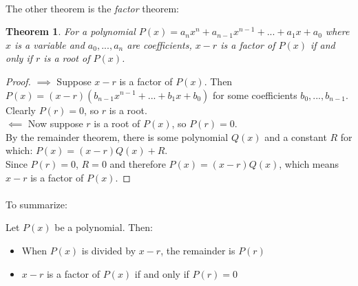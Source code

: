 \documentclass[12pt, a4paper, titlepage, twoside]{article}
\newtheorem*{theorem*}{Theorem}
\begin{document}
	\paragraph{}
	The other theorem is the \textit{factor} theorem:\\
	
	\begin{pf}
		\begin{theorem*}
			For a polynomial $P(x) = a_n x^n + a_{n-1} x^{n-1} + ... + a_1 x + a_0$ where $x$ is a variable and $a_0, ..., a_n$ are
			coefficients, $x-r$ is a factor of $P(x)$ if and only if $r$ is a root of $P(x)$.
		\end{theorem*}
		
		\tcbline
		
		\begin{proof}
			$\implies$ Suppose $x-r$ is a factor of $P(x)$. Then\\ $P(x) = (x-r)(b_{n-1} x^{n-1} + ... + b_1 x + b_0)$ for some coefficients 
			$b_0, ..., b_{n-1}$. \\ 
			
			Clearly $P(r) = 0$, so $r$ is a root.\\
			
			$\impliedby$ Now suppose $r$ is a root of $P(x)$, so $P(r) = 0$.\\
			
			By the remainder theorem, there is some polynomial $Q(x)$ and a constant $R$ for which: $P(x) = (x-r)Q(x) + R$.\\
			
			Since $P(r) = 0$, $R = 0$ and therefore $P(x) = (x-r)Q(x)$, which means $x-r$ is a factor of $P(x)$.
		\end{proof}
	\end{pf} 
	
	\paragraph{}
	To summarize:\\
	
	\begin{kp}
		Let $P(x)$ be a polynomial. Then:
		
		\begin{itemize}
			\item When $P(x)$ is divided by $x-r$, the remainder is $P(r)$
			\item $x-r$ is a factor of $P(x)$ if and only if $P(r) = 0$
		\end{itemize}
	\end{kp}
	
\end{document}
